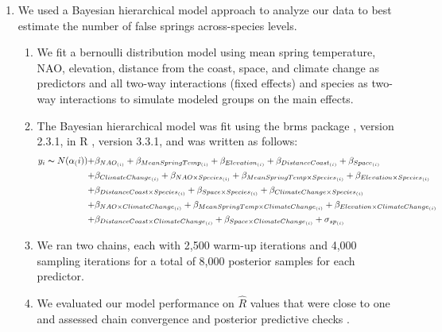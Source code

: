 \documentclass{article}\usepackage[]{graphicx}\usepackage[]{color}
\begin{document}
\begin{enumerate}
\item We used a Bayesian hierarchical model approach to analyze our data to best estimate the number of false springs across-species levels. 
\begin{enumerate}
\item We fit a bernoulli distribution model using mean spring temperature, NAO, elevation, distance from the coast, space, and climate change as predictors and all two-way interactions (fixed effects) and species as two-way interactions to simulate modeled groups on the main effects.
\item The Bayesian hierarchical model was fit using the brms package \citep{brms}, version 2.3.1,  in R \citep{R}, version 3.3.1, and was written as follows: 
\begin{align*} \label{eq:1} %
y_i \thicksim N(\alpha_(i)) +&  \beta_{NAO_{(i)}} + \beta_{MeanSpringTemp_{(i)}} + \beta_{Elevation_{(i)}} + \beta_{DistanceCoast_{(i)}} + \beta_{Space_{(i)}} \\ +& \beta_{ClimateChange_{(i)}}
+ \beta_{NAO \times Species_{(i)}} + \beta_{MeanSpringTemp \times Species_{(i)}} + \beta_{Elevation \times Species_{(i)}} \\ +& \beta_{DistanceCoast \times Species_{(i)}} + \beta_{Space \times Species_{(i)}} + \beta_{ClimateChange \times Species_{(i)}} \\
+& \beta_{NAO \times ClimateChange_{(i)}} + \beta_{MeanSpringTemp \times ClimateChange_{(i)}} 
+ \beta_{Elevation \times ClimateChange_{(i)}} \\ +& \beta_{DistanceCoast \times ClimateChange_{(i)}} + \beta_{Space \times ClimateChange_{(i)}} + \sigma_{sp_{(i)}} 
\end{align*}
\item We ran two chains, each with 2,500 warm-up iterations and 4,000 sampling iterations for a total of 8,000 posterior samples for each predictor. 
\item We evaluated our model performance on $\hat{R}$ values that were close to one and assessed chain convergence and posterior predictive checks \citep{Gelman2006}.
\end{enumerate}
\end{enumerate}
\end{document}
